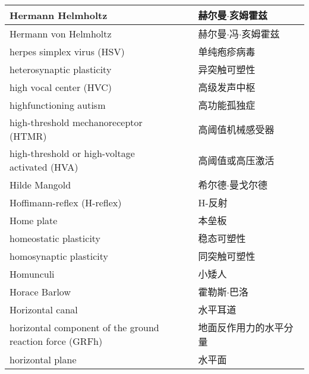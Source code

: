 \begin{longtable}{lll}
	\midrule
	Hermann Helmholtz     &&  赫尔曼$\cdot$亥姆霍兹 \\
	
	\midrule
	Hermann von Helmholtz     &&  赫尔曼$\cdot$冯$\cdot$亥姆霍兹 \\
	
	\midrule
	herpes simplex virus (HSV)   &&  单纯疱疹病毒 \\
	
	\midrule
	heterosynaptic plasticity   &&  异突触可塑性 \\
	
	\midrule
	high vocal center (HVC)    &&  高级发声中枢  \\
	
	\midrule
	highfunctioning autism     &&  高功能孤独症  \\
	
	\midrule
	high-threshold mechanoreceptor (HTMR)     &&  高阈值机械感受器  \\
	
	\midrule
	\makecell[l]{high-threshold or high-voltage\\ activated (HVA)}    &&  高阈值或高压激活  \\
	
	\midrule
	Hilde Mangold     &&  希尔德$\cdot$曼戈尔德  \\
	
	\midrule
	Hoffimann-reflex (H-reflex)     &&  H-反射  \\
	
	\midrule
	Home plate     &&  本垒板  \\
	
	\midrule
	homeostatic plasticity     &&  稳态可塑性  \\
	
	\midrule
	homosynaptic plasticity     &&  同突触可塑性  \\
	
	\midrule
	Homunculi     &&  小矮人  \\
	
	\midrule
	Horace Barlow     &&  霍勒斯$\cdot$巴洛  \\
	
	\midrule
	Horizontal canal     &&  水平耳道  \\
	
	\midrule
	\makecell[l]{horizontal component of the ground\\ reaction force (GRFh)}    &&  地面反作用力的水平分量  \\
	
	\midrule
	horizontal plane     &&  水平面  \\
	

\end{longtable}
